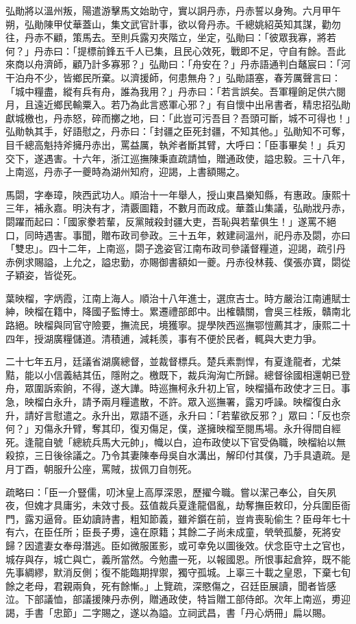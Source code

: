 \begin{pinyinscope}
弘勛將以溫州叛，陽遣游擊馬文始助守，實以詗丹赤，丹赤誓以身殉。六月甲午朔，弘勛陳甲仗華蓋山，集文武官計事，欲以脅丹赤。千總姚紹英知其謀，勸勿往，丹赤不顧，策馬去。至則兵露刃夾階立，坐定，弘勛曰：「彼眾我寡，將若何？」丹赤曰：「提標前鋒五千人已集，且民心效死，戰即不足，守自有餘。吾此來商以舟濟師，顧乃計多寡邪？」弘勛曰：「舟安在？」丹赤語通判白鼇宸曰：「河干泊舟不少，皆鄉民所棄。以濟援師，何患無舟？」弘勛語塞，春芳厲聲言曰：「城中糧盡，縱有兵有舟，誰為我用？」丹赤曰：「若言誤矣。吾軍糧餉足供六閱月，且遠近鄉民輸粟入。若乃為此言惑軍心邪？」有自懷中出帛書者，精忠招弘勛獻城檄也，丹赤怒，碎而擲之地，曰：「此豈可污吾目？吾頭可斷，城不可得也！」弘勛執其手，好語慰之，丹赤曰：「封疆之臣死封疆，不知其他。」弘勛知不可奪，目千總高魁持斧擁丹赤出，罵益厲，執斧者斷其臂，大呼曰：「臣事畢矣！」兵刃交下，遂遇害。十六年，浙江巡撫陳秉直疏請恤，贈通政使，謚忠毅。三十八年，上南巡，丹赤子一夔時為湖州知府，迎謁，上書額賜之。

馬閟，字奉璋，陜西武功人。順治十一年舉人，授山東昌樂知縣，有惠政。康熙十三年，補永嘉。明決有才，清覈圖籍，不數月而政成。華蓋山集議，弘勛戕丹赤，閟躍而起曰：「國家豢若輩，反黨賊殺封疆大吏，吾恥與若輩俱生！」遂罵不絕口，同時遇害。事聞，贈布政司參政。三十五年，敕建祠溫州，祀丹赤及閟，亦曰「雙忠」。四十二年，上南巡，閟子逸姿官江南布政司參議督糧道，迎謁，疏引丹赤例求賜謚，上允之，謚忠勤，亦賜御書額如一夔。丹赤役林莪、僕張亦寶，閟從子穎姿，皆從死。

葉映榴，字炳霞，江南上海人。順治十八年進士，選庶吉士。時方嚴治江南逋賦士紳，映榴在籍中，降國子監博士。累遷禮部郎中。出榷贛關，會吳三桂叛，贛南北路絕。映榴與同官守險要，撫流民，境獲寧。提學陜西巡撫鄂愷薦其才，康熙二十四年，授湖廣糧儲道。清積逋，減耗羨，事有不便於民者，輒與大吏力爭。

二十七年五月，廷議省湖廣總督，並裁督標兵。楚兵素剽悍，有夏逢龍者，尤桀黠，能以小信義結其伍，隱附之。檄既下，裁兵洶洶亡所歸。總督徐國相還朝已登舟，眾圍訴索餉，不得，遂大譁。時巡撫柯永升初上官，映榴攝布政使才三日。事急，映榴白永升，請予兩月糧遣散，不許。眾入巡撫署，露刃呼譟。映榴復白永升，請好言慰遣之。永升出，眾語不遜，永升曰：「若輩欲反邪？」眾曰：「反也奈何？」刃傷永升臂，奪其印，復刃傷足，僕，遂擁映榴至閱馬場。永升得間自經死。逢龍自號「總統兵馬大元帥」，幟以白，迫布政使以下官受偽職，映榴紿以無殺掠，三日後徐議之。乃令其妻陳奉母吳自水溝出，解印付其僕，乃手具遺疏。是月丁酉，朝服升公座，罵賊，拔佩刀自刎死。

疏略曰：「臣一介豎儒，叨沐皇上高厚深恩，歷擢今職。嘗以潔己奉公，自矢夙夜，但媿才具庸劣，未效寸長。茲值裁兵夏逢龍倡亂，劫奪撫臣敕印，分兵圍臣衙門，露刃逼脅。臣幼讀詩書，粗知節義，雖斧鑕在前，豈肯喪恥偷生？臣母年七十有六，在臣任所；臣長子旉，遠在原籍；其餘二子尚未成童，煢煢孤嫠，死將安歸？因遣妻女奉母潛逃。臣如微服匿影，或可幸免以圖後效。伏念臣守土之官也，城存與存，城亡與亡，義所當然。今勉盡一死，以報國恩。所恨事起倉猝，既不能先事綢繆，默消反側；復不能臨期捍禦，獨守孤城。上辜三十載之皇恩，下棄七旬餘之老母，君親兩負，死有餘慚。」上覽疏，深愍傷之，召廷臣展讀，聞者皆感泣。下部議恤，部議援陳丹赤例，贈通政使，特旨贈工部侍郎。次年上南巡，旉迎謁，手書「忠節」二字賜之，遂以為謚。立祠武昌，書「丹心炳冊」扁以賜。


\end{pinyinscope}
